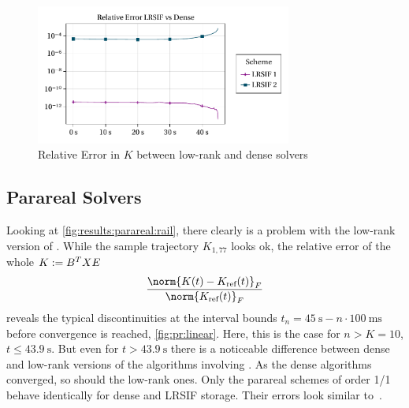 \begin{figure}[tp]
  \centering
  \includegraphics[width=0.75\textwidth]{figures/fig_results_sequential_err.pdf}
  \caption{Relative Error in $K$ between low-rank and dense solvers}
\end{figure}

\subsection{Parareal Solvers}
\label{sec:results:parareal}

Looking at \autoref{fig:results:parareal:rail},
there clearly is a problem with the low-rank version of .
While the sample trajectory $K_{1,77}$ looks ok,
the relative error of the whole $K := B^T X E$
\begin{equation}
  \frac{\norm{K(t) - K_\text{ref}(t)}_F}{\norm{K_\text{ref}(t)}_F}
\end{equation}
reveals the typical discontinuities at the interval bounds
$t_n = \SI{45}{\second} - n \cdot \SI{100}{\milli\second}$
before convergence is reached,
\cf \autoref{fig:pr:linear}.
Here, this is the case for $n > K = 10$, \ie $t \leq \SI{43.9}{\second}$.
But even for $t > \SI{43.9}{\second}$ there is a noticeable difference between
dense and low-rank versions of the algorithms involving .
As the dense algorithms converged, so should the low-rank ones.
Only the parareal schemes of order 1/1 behave identically for dense and \ac{LRSIF} storage.
Their errors look similar to~\cite[Fig.~1]{Lang2015}.

